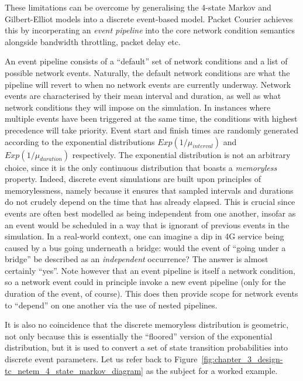 \newpage

These limitations can be overcome by generalising the 4-state Markov and Gilbert-Elliot models into a discrete
event-based model\cite{discrete_event_simulation}. Packet Courier achieves this by incorperating an \emph{event
pipeline} into the core network condition semantics alongside bandwidth throttling, packet delay etc.

An event pipeline consists of a ``default'' set of network conditions and a list of possible network events.
Naturally, the default network conditions are what the pipeline will revert to when no network events are currently
underway. Network events are characterised by their mean interval and duration, as well as what network conditions
they will impose on the simulation. In instances where multiple events have been triggered at the same time, the
conditions with highest precedence will take priority. Event start and finish times are randomly generated according
to the exponential distributions $Exp(1/\mu_{interval})$ and $Exp(1/\mu_{duration})$ respectively. The
exponential distribution is not an arbitrary choice, since it is the only continuous distribution that boasts a
\emph{memoryless} property\cite{memoryless_random_variables}. Indeed, discrete event simulations are built upon
principles of memorylessness, namely because it ensures that sampled intervals and durations do not crudely depend on
the time that has already elapsed. This is crucial since events are often best modelled as being independent from one
another, insofar as an event would be scheduled in a way that is ignorant of previous events in the simulation. In a
real-world context, one can imagine a dip in 4G service being caused by a bus going underneath a bridge: would the
event of ``going under a bridge'' be described as an \emph{independent} occurrence? The answer is almost certainly
``yes''. Note however that an event pipeline is itself a network condition, so a network event could in principle
invoke a new event pipeline (only for the duration of the event, of course). This does then provide scope for
network events to ``depend'' on one another via the use of nested pipelines.

It is also no coincidence that the discrete memoryless distribution is geometric\cite{memoryless_random_variables},
not only because this is essentially the ``floored'' version of the exponential distribution, but it is used to
convert a set of state transition probabilities into discrete event parameters. Let us refer back to
Figure~\ref{fig:chapter_3_design-tc_netem_4_state_markov_diagram} as the subject for a worked example.

